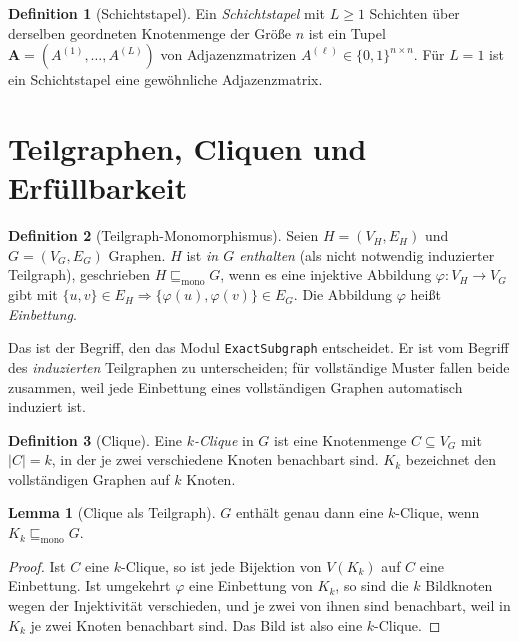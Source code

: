 \documentclass[a4paper,12pt,twoside]{report}
\DeclareRobustCommand{\_}{\textunderscore\allowbreak{}}
\theoremstyle{definition}
\newtheorem{definition}{Definition}[chapter]
\newtheorem{lemma}{Lemma}[chapter]
\begin{document}
\begin{definition}[Schichtstapel]
	Ein \emph{Schichtstapel} mit $L\ge 1$ Schichten über derselben geordneten Knotenmenge der Größe $n$ ist ein Tupel $\mathbf{A}=(A^{(1)},\ldots,A^{(L)})$ von Adjazenzmatrizen $A^{(\ell)}\in\{0,1\}^{n\times n}$. Für $L=1$ ist ein Schichtstapel eine gewöhnliche Adjazenzmatrix.
\end{definition}
 
\section{Teilgraphen, Cliquen und Erfüllbarkeit}
 
\begin{definition}[Teilgraph-Monomorphismus]
	Seien $H=(V_H,E_H)$ und $G=(V_G,E_G)$ Graphen. $H$ ist \emph{in $G$ enthalten} (als nicht notwendig induzierter Teilgraph), geschrieben $H\sqsubseteq_{\mathrm{mono}}G$, wenn es eine injektive Abbildung $\varphi:V_H\to V_G$ gibt mit $\{u,v\}\in E_H \Rightarrow \{\varphi(u),\varphi(v)\}\in E_G$. Die Abbildung $\varphi$ heißt \emph{Einbettung}.
\end{definition}
 
Das ist der Begriff, den das Modul \texttt{ExactSubgraph} entscheidet. Er ist vom Begriff des \emph{induzierten} Teilgraphen zu unterscheiden; für vollständige Muster fallen beide zusammen, weil jede Einbettung eines vollständigen Graphen automatisch induziert ist.
 
\begin{definition}[Clique]
	Eine \emph{$k$-Clique} in $G$ ist eine Knotenmenge $C\subseteq V_G$ mit $|C|=k$, in der je zwei verschiedene Knoten benachbart sind. $K_k$ bezeichnet den vollständigen Graphen auf $k$ Knoten.
\end{definition}
 
\begin{lemma}[Clique als Teilgraph]
	\label{lem:clique_teilgraph}
	$G$ enthält genau dann eine $k$-Clique, wenn $K_k\sqsubseteq_{\mathrm{mono}}G$.
\end{lemma}
 
\begin{proof}
	Ist $C$ eine $k$-Clique, so ist jede Bijektion von $V(K_k)$ auf $C$ eine Einbettung. Ist umgekehrt $\varphi$ eine Einbettung von $K_k$, so sind die $k$ Bildknoten wegen der Injektivität verschieden, und je zwei von ihnen sind benachbart, weil in $K_k$ je zwei Knoten benachbart sind. Das Bild ist also eine $k$-Clique.
\end{proof}
 
\end{document}
